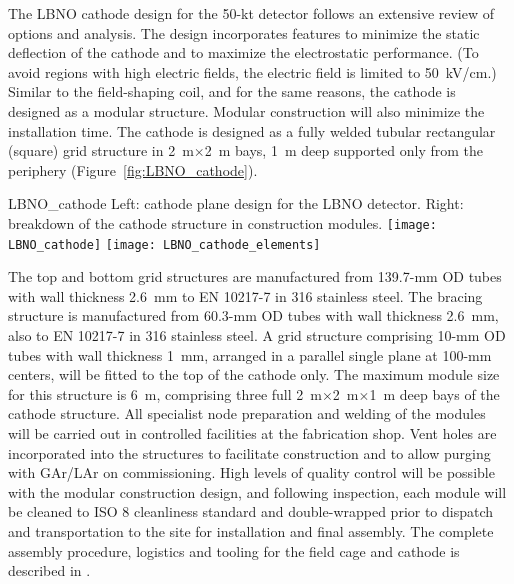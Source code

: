 The LBNO cathode design for the 50-kt detector %
follows an extensive
review of options and analysis.%
The design incorporates
features to minimize the static deflection of the cathode and to
maximize the electrostatic performance. (To avoid regions with high
electric fields, the electric field is limited to 50~kV/cm.) 
Similar to the field-shaping coil, and for the same reasons, the cathode is designed as a modular structure. 
Modular construction will also minimize the installation time. 
The cathode is designed as a fully welded tubular rectangular
(square)  grid structure in 2~m$\times$2~m bays, 1~m deep  supported only from
the %
periphery (Figure~\ref{fig:LBNO_cathode}).  
\begin{cdrfigure}{LBNO_cathode}
{\small Left: cathode plane design for the LBNO detector. Right: breakdown of 
the cathode structure in construction modules.}
\texttt{[image: LBNO\_cathode]} \hfil
\texttt{[image: LBNO\_cathode\_elements]}
\end{cdrfigure}
The top and bottom grid structures  are manufactured from 139.7-mm OD tubes with wall thickness 
2.6~mm %
to EN 10217-7  in 316 stainless steel.  The bracing
structure is manufactured from 60.3-mm OD tubes with wall thickness 2.6~mm, also to EN
10217-7 in 316 stainless steel.  A grid structure comprising 
 10-mm OD tubes with wall thickness 1~mm,
 arranged in a parallel single plane  at 100-mm centers,
will be fitted to the top of the cathode only.  The maximum module size
for this structure
is 6~m, comprising three full 2~m$\times$2~m$\times$1~m deep bays
of the cathode structure.  All specialist node  preparation and welding
of the modules will be carried out in controlled facilities at the fabrication shop. 
 Vent holes are incorporated into the structures to
facilitate construction and to allow purging with GAr/LAr on
commissioning. High levels of quality control will be possible with
the modular construction design, and following inspection, each module
will be cleaned to ISO 8 cleanliness standard and double-wrapped prior
to dispatch and transportation to the site for installation and final
assembly. %
The complete assembly procedure, logistics and
tooling for the field cage and cathode is described in \anxlbnob.

